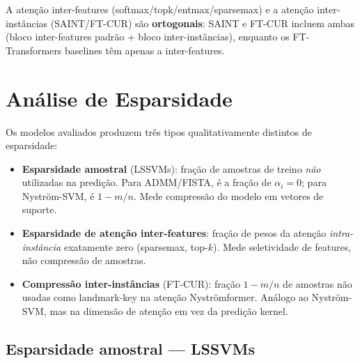 \documentclass[12pt,a4paper]{article}
\begin{document}
\noindent
A atenção inter-features (softmax/topk/entmax/sparsemax) e a atenção
inter-instâncias (SAINT/FT-CUR) são \textbf{ortogonais}: SAINT e FT-CUR
incluem ambas (bloco inter-features padrão + bloco inter-instâncias), enquanto
os FT-Transformers baselines têm apenas a inter-features.

\section{Análise de Esparsidade}
\label{sec:sparsity}

Os modelos avaliados produzem três tipos qualitativamente distintos de esparsidade:

\begin{itemize}
  \item \textbf{Esparsidade amostral} (LSSVMs): fração de amostras de treino
        \emph{não} utilizadas na predição. Para ADMM/FISTA, é a fração de
        $\alpha_i = 0$; para Nyström-SVM, é $1 - m/n$. Mede compressão do
        modelo em vetores de suporte.
  \item \textbf{Esparsidade de atenção inter-features}: fração de pesos da
        atenção \emph{intra-instância} exatamente zero (sparsemax, top-$k$).
        Mede seletividade de features, não compressão de amostras.
  \item \textbf{Compressão inter-instâncias} (FT-CUR): fração $1 - m/n$ de
        amostras não usadas como landmark-key na atenção Nyströmformer. Análogo
        ao Nyström-SVM, mas na dimensão de atenção em vez da predição kernel.
\end{itemize}

\subsection{Esparsidade amostral — LSSVMs}
\end{document}
